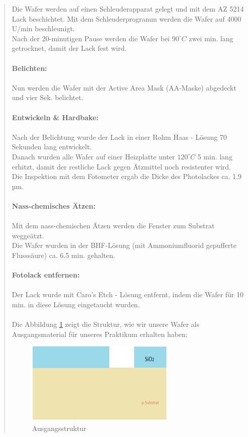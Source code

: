 \begin{quote}
			Die  Wafer werden auf einen Schleuderapparat gelegt und mit dem AZ
			5214  Lack beschichtet. Mit dem Schleuderprogramm werden die Wafer
			auf 4000 U/min beschleunigt.\\
			Nach der 20-minutigen Pause werden die Wafer bei $90^{\circ}C$ zwei min.
			lang getrocknet, damit der Lack fest wird.\\
			\\
			\textbf{Belichten:}\\
			\\
			Nun werden die Wafer mit der Active Area Mask  (AA-Maske) abgedeckt
			und vier Sek. belichtet.\\
			\\
			\textbf{Entwickeln \& Hardbake:}\\
			\\
			Nach der Belichtung wurde der Lack in einer Rohm Haas - Lösung 70
			Sekunden lang entwickelt.\\
			Danach wurden alle Wafer auf einer Heizplatte unter $120^{\circ}C$ 5
			min. lang erhitzt, damit der restliche Lack gegen Ätzmittel noch
			resistenter wird.\\
			Die Inspektion mit dem Fotometer ergab die Dicke des Photolackes
			ca. 1.9 µm.\\
			\\
            \textbf{Nass-chemisches Ätzen:}\\
			\\
			Mit dem nass-chemischen Ätzen werden die Fenster zum Substrat
			weggeätzt.\\
			Die Wafer wurden in der BHF-Lösung (mit Ammoniumfluorid gepufferte
			Flusssäure) ca. 6.5 min. gehalten.\\
			\\
			\textbf{Fotolack entfernen:}\\
			\\
			Der Lack wurde mit  Caro's Etch - Lösung entfernt, indem die Wafer
			für 10 min. in diese Lösung eingetaucht wurden.\\
			\\
			Die Abbildung \ref{fig:AusStruk} zeigt die Struktur, wie wir unsere
			Wafer als Ausgangsmaterial für unseres Praktikum erhalten haben:

            \vspace{2em}

            \begin{figure}[H]
				\hspace{5.0cm}
                \includegraphics[scale=0.8, trim = 0cm 0cm 0cm 0cm,clip]
                	{./HerstellungBilder/AusgangsStruktur.png}
                  \caption{Ausgangsstruktur}
                \label{fig:AusStruk}
            \end{figure}


\end{quote}
